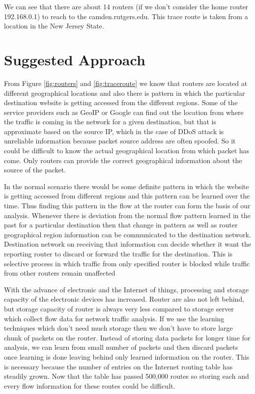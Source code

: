 \documentclass[10pt,oneside,a4paper]{article}
\begin{document}
We can see that there are about 14 routers (if we don't consider the home router 192.168.0.1) to reach to the camden.rutgers.edu. This trace route is taken from a location in the New Jersey State.\par


\section{Suggested Approach}

From Figure \ref{fig:routers} and \ref{fig:traceroute} we know that routers are located at different geographical locations and also there is pattern in which the particular destination website is getting accessed from the different regions. Some of the service providers such as  GeoIP or Google can find out the location from where the traffic is coming in the network for a given destination, but that is approximate based on the source IP, which in the case of DDoS attack is unreliable information because packet source address are often spoofed. So it could be difficult to know the actual geographical location from which packet has come. Only routers can provide the correct geographical information about the source of the packet.\par

In the normal scenario there would be some definite pattern in which the website is getting accessed from different regions and this pattern can be learned over the time. Thus finding this pattern in the flow at the router can form the basis of our analysis. Whenever there is deviation from the normal flow pattern learned in the past for a particular destination then that change in pattern as well as router geographical region information can be communicated to the destination network. Destination network on receiving that information can decide whether it want the reporting router to discard or forward the traffic for the destination. This is selective process in which traffic from only specified router is blocked while traffic from other routers remain unaffected\par

With the advance of electronic and the Internet of things, processing and storage capacity of the electronic devices has increased. Router are also not left behind, but storage capacity of router is always very less compared to storage server which collect flow data for network traffic analysis. If we use the learning techniques which don't need much storage then we don't have to store large chunk of packets on the router. Instead of storing data packets for longer time for analysis, we can learn from small number of packets and then discard packets once learning is done leaving behind only learned information on the router. This is necessary because the number of entries on the Internet routing table has steadily grown. Now that the table has passed 500,000 routes\cite{routingtablesize} so storing each and every flow information for these routes could be difficult.\par
\end{document}
